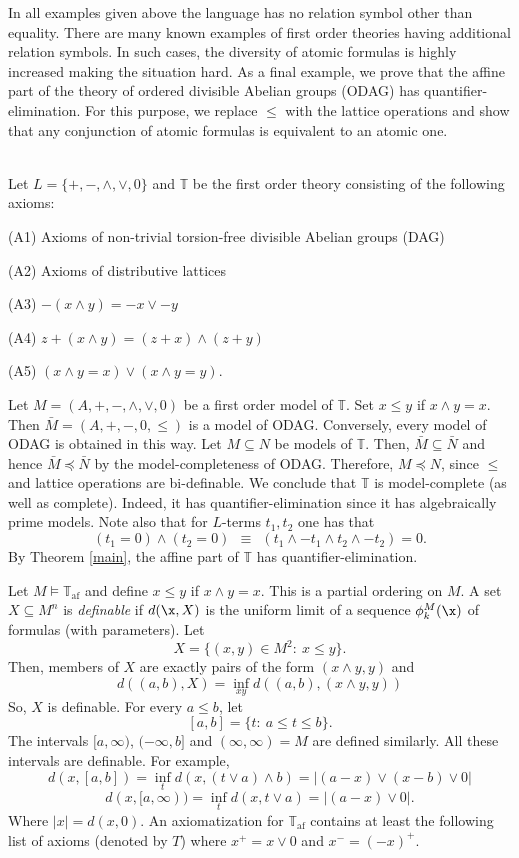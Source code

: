 \documentclass[12pt]{article}
\begin{document}
In all examples given above the language has no relation symbol other than equality.
There are many known examples of first order theories having additional relation symbols.
In such cases, the diversity of atomic formulas is highly increased making the situation hard.
As a final example, we prove that the affine part of the theory of
ordered divisible Abelian groups (ODAG) has quantifier-elimination.
For this purpose, we replace $\leqslant$ with the lattice operations
and show that any conjunction of atomic formulas is equivalent to an atomic one.
\bigskip

\\
Let $L=\{+,-,\wedge,\vee,0\}$ and $\mathbb T$ be the first order theory consisting of the following axioms:

(A1) Axioms of non-trivial torsion-free divisible Abelian groups (DAG)

(A2) Axioms of distributive lattices

(A3) $-(x\wedge y)=-x\vee -y$

(A4) $z+(x\wedge y)=(z+x)\wedge(z+y)$

(A5) $(x\wedge y=x)\vee(x\wedge y=y)$.
\bigskip

Let $M=(A,+,-,\wedge,\vee,0)$ be a first order model of $\mathbb T$. Set $x\leqslant y$ if $x\wedge y=x$.
Then $\bar{M}=(A,+,-,0,\leqslant)$ is a model of ODAG. Conversely, every model of ODAG is obtained in this way.
Let $M\subseteq N$ be models of $\mathbb T$. Then, $\bar{M}\subseteq\bar{N}$
and hence $\bar{M}\preccurlyeq\bar{N}$ by the model-completeness of ODAG.
Therefore, $M\preccurlyeq N$, since $\leqslant$ and lattice operations are bi-definable.
We conclude that $\mathbb T$ is model-complete (as well as complete).
Indeed, it has quantifier-elimination since it has algebraically prime models.
Note also that for $L$-terms $t_1,t_2$ one has that
$$(t_1=0)\wedge(t_2=0)\ \ \equiv\ \ (t_1\wedge-t_1\wedge t_2\wedge-t_2)=0.$$
By Theorem \ref{main}, the affine part of $\mathbb T$ has quantifier-elimination.

Let $M\vDash\mathbb{T}_{\textrm{af}}$ and define $x\leqslant y$ if $x\wedge y=x$.
This is a partial ordering on $M$.
A set $X\subseteq M^n$ is \emph{definable} if $d(\x,X)$ is the uniform limit of a sequence
$\phi^M_k(\x)$ of formulas (with parameters).
Let $$X=\{(x,y)\in M^2:\ x\leqslant y\}.$$
Then, members of $X$ are exactly pairs of the form $(x\wedge y,y)$ and
$$d((a,b),X)=\inf_{xy} d((a,b),(x\wedge y,y))$$
So, $X$ is definable. For every $a\leqslant b$, let $$[a,b]=\{t:\ a\leqslant t\leqslant b\}.$$
The intervals $[a,\infty)$, $(-\infty,b]$ and $(\infty,\infty)=M$ are defined similarly.
All these intervals are definable. For example,
$$d(x,[a,b])=\inf_t d(x,(t\vee a)\wedge b)=|(a-x)\vee(x-b)\vee0|$$
$$d(x,[a,\infty))=\inf_t d(x,t\vee a)=|(a-x)\vee0|.$$
Where $|x|=d(x,0)$. An axiomatization for $\mathbb{T}_{\textrm{af}}$ contains at least the following list of axioms
(denoted by $T$) where $x^+=x\vee0$ and $x^-=(-x)^+$.
\bigskip
\end{document}
